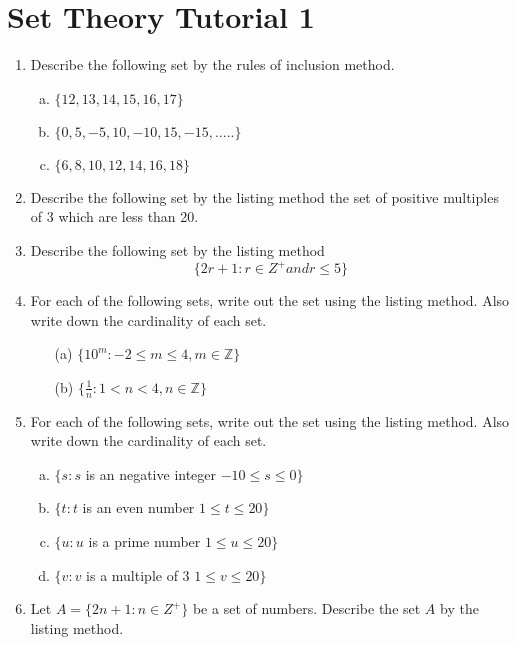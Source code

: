 \documentclass[a4paper,12pt]{article}
\begin{document}
\section*{Set Theory Tutorial 1}
\begin{enumerate}
    \item Describe the following set by the rules of inclusion method.
    \begin{enumerate}[(a)]
        \item $\{12,13,14,15,16,17\}$
\item $\{0,5,-5,10,-10,15,-15,.....\}$
\item $\{6,8,10,12,14,16,18\}$
    \end{enumerate}



\item Describe the following set by the listing method the set of positive multiples of 3 which are less than 20.
\item Describe the following set by the listing method
\[ \{ 2r+1 : r \in Z^{+} and r \leq 5  \} \]

\item For each of the following sets, write out the set using the listing method.
Also write down the cardinality of each set.

\begin{itemize}
\item[(a)] $\{ 10^m : -2 \leq m \leq 4, m \in \mathbb{Z} \} $
\item[(b)]  $ \{ \frac{1}{n}: 1 < n < 4, n \in \mathbb{Z} \} $
\end{itemize}

\item For each of the following sets, write out the set using the listing method.
Also write down the cardinality of each set.

\begin{enumerate}[(a)] 
\item $\{ s : s $ is an negative integer $ -10 \leq s \leq 0 \}$
\item $\{ t : t $ is an even number $ 1 \leq t \leq 20 \}$
\item $\{ u : u $ is a prime number $ 1 \leq u \leq 20 \}$
\item $\{ v : v $ is a multiple of 3 $ 1 \leq v \leq 20 \}$
\end{enumerate}
\item Let $A = \{2n+1 : n \in Z^{+}\}$ be a set of numbers. Describe the set $A$ by the listing method.


\end{enumerate}
\end{document}
